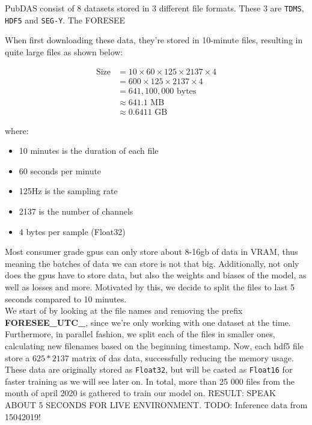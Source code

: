 PubDAS consist of 8 datasets stored in 3 different file formats. These 3 are \texttt{TDMS}, \texttt{HDF5} and \texttt{SEG-Y}. 
The FORESEE


When first downloading these data, they're stored in 10-minute files, resulting in quite large files as shown below:

\begin{align*}
\text{Size} &= 10 \times 60 \times 125 \times 2137 \times 4 \\
&= 600 \times 125 \times 2137 \times 4 \\
&= 641,100,000 \text{ bytes} \\
&\approx 641.1 \text{ MB} \\
&\approx 0.6411 \text{ GB}
\end{align*}

where:
\begin{itemize}
    \item 10 minutes is the duration of each file
    \item 60 seconds per minute
    \item 125\si{\hertz} is the sampling rate
    \item 2137 is the number of channels
    \item 4 bytes per sample (Float32)
\end{itemize}

Most consumer grade \acrshort{gpu}s can only store about 8-16gb of data in VRAM, thus meaning the batches of data we can store is not that big. Additionally, not only does the \acrshort{gpu}s have to store data, but also the weights and biases of the model, as well as losses and more. Motivated by this, we decide to split the files to last 5 seconds compared to 10 minutes. \\ 

We start of by looking at the file names and removing the prefix \textbf{FORESEE\_UTC\_}, since we're only working with one dataset at the time. Furthermore, in parallel fashion, we split each of the files in smaller ones, calculating new filenames based on the beginning timestamp. Now, each \acrshort{hdf5} file store a $625*2137$ matrix of \acrshort{das} data, successfully reducing the memory usage. 
These data are originally stored as \texttt{Float32}, but will be casted as \texttt{Float16} for faster training as we will see later on. In total, more than 25 000 files from the month of april 2020 is gathered to train our model on. 
RESULT: SPEAK ABOUT 5 SECONDS FOR LIVE ENVIRONMENT.
TODO: Inference data from 15042019!

